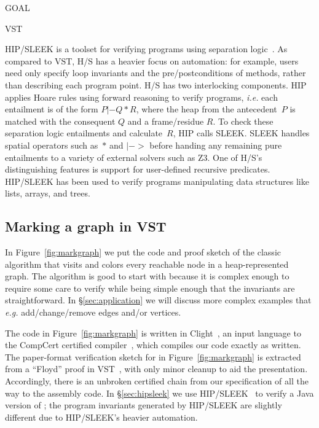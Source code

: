 GOAL

VST

HIP/SLEEK is a toolset for verifying programs using separation logic~\cite{chin:hipsleek}.  As compared to VST, H/S has a heavier focus on automation: for example, users need only specify loop invariants and the pre/postconditions of methods, rather than describing each program point.  H/S has two interlocking components.  HIP applies Hoare rules using forward reasoning to verify programs, \emph{i.e.} each entailment is of the form $P |- Q * R$, where the heap from the antecedent~$P$ is matched with the consequent $Q$ and a frame/residue $R$. To check these separation logic entailments and calculate~$R$, HIP calls SLEEK.  SLEEK handles spatial operators such as~$*$ and $|->$ before handing any remaining pure entailments to a variety of external solvers such as Z3.  One of H/S's distinguishing features is support for user-defined recursive predicates.  HIP/SLEEK has been used to verify programs manipulating data structures like lists, arrays, and trees.

\subsection{Marking a graph in VST}



In Figure~\ref{fig:markgraph} we put the code and proof sketch of the classic  algorithm that visits and colors every reachable node in a heap-represented graph.  The  algorithm is good to start with because it is complex enough to require some care to verify while being simple enough that the invariants are straightforward.  In \S\ref{sec:application} we will discuss more complex examples that \emph{e.g.} add/change/remove edges and/or vertices.

The code in Figure~\ref{fig:markgraph} is written in Clight~\cite{blazy:clight}, an input language to the CompCert certified compiler~\cite{leroy:compcert}, which compiles our code exactly as written.
The paper-format verification sketch for  in Figure~\ref{fig:markgraph} is extracted from
a ``Floyd'' proof in VST~\cite{appel:programlogics}, with only minor cleanup to aid the presentation.
Accordingly, there is an unbroken certified chain from our specification of  all the way to the assembly code.  In \S\ref{sec:hipsleek} we use HIP/SLEEK~\cite{chin:hipsleek} to verify a Java version of ; the program invariants generated by HIP/SLEEK are slightly different due to HIP/SLEEK's heavier automation.

